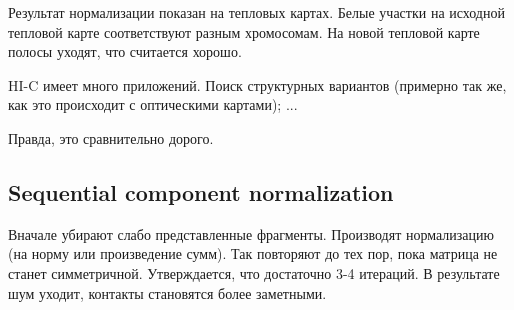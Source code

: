 \documentclass[main.tex]{subfiles}
\begin{document}
Результат нормализации показан на тепловых картах.
Белые участки на исходной тепловой карте соответствуют разным хромосомам.
На новой тепловой карте полосы уходят, что считается хорошо.
 
 \begin{leftbar}
HI-C имеет много приложений.
Поиск структурных вариантов (примерно так же, как это происходит с оптическими картами); ...

Правда, это сравнительно дорого.
 \end{leftbar}

\subsection{Sequential component normalization}

Вначале убирают слабо представленные фрагменты.
Производят нормализацию (на норму или произведение сумм).
Так повторяют до тех пор, пока матрица не станет симметричной.
Утверждается, что достаточно 3-4 итераций.
В результате шум уходит, контакты становятся более заметными.
\end{document}
